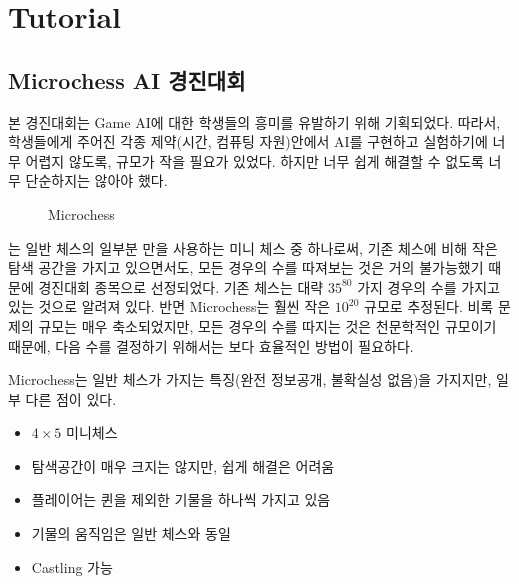 \documentclass[letterpaper,10pt,english]{sphinxmanual}
\begin{document}
\chapter{Tutorial}
\label{\detokenize{index:tutorial}}

\section{Microchess AI 경진대회}
\label{\detokenize{01-microchess_ai_competition::doc}}\label{\detokenize{01-microchess_ai_competition:microchess-ai}}
본 경진대회는 Game AI에 대한 학생들의 흥미를 유발하기 위해 기획되었다.
따라서, 학생들에게 주어진 각종 제약(시간, 컴퓨팅 자원)안에서 AI를 구현하고 실험하기에 너무 어렵지 않도록,
규모가 작을 필요가 있었다. 하지만 너무 쉽게 해결할 수 없도록 너무 단순하지는 않아야 했다.

\begin{figure}[htbp]
\centering
\capstart

\noindent{}
\caption{Microchess}\label{\detokenize{01-microchess_ai_competition:microchess}}\label{\detokenize{01-microchess_ai_competition:id14}}\end{figure}

{\hyperref[\detokenize{01-microchess_ai_competition:microchess}]{}} 는 일반 체스의 일부분 만을 사용하는 미니 체스 중 하나로써,
기존 체스에 비해 작은 탐색 공간을 가지고 있으면서도, 모든 경우의 수를 따져보는 것은 거의 불가능했기 때문에
경진대회 종목으로 선정되었다. 기존 체스는 대략 \(35^{80}\) 가지 경우의 수를 가지고 있는 것으로
알려져 있다. 반면 Microchess는 훨씬 작은 \(10^{20}\) 규모로 추정된다.
비록 문제의 규모는 매우 축소되었지만, 모든 경우의 수를 따지는 것은 천문학적인 규모이기 때문에,
다음 수를 결정하기 위해서는 보다 효율적인 방법이 필요하다.

Microchess는 일반 체스가 가지는 특징(완전 정보공개, 불확실성 없음)을 가지지만, 일부 다른 점이 있다.
\begin{itemize}
\item {} 
\(4 \times 5\) 미니체스

\item {} 
탐색공간이 매우 크지는 않지만, 쉽게 해결은 어려움

\item {} 
플레이어는 퀸을 제외한 기물을 하나씩 가지고 있음

\item {} 
기물의 움직임은 일반 체스와 동일

\item {} 
Castling 가능

\end{itemize}
\end{document}
